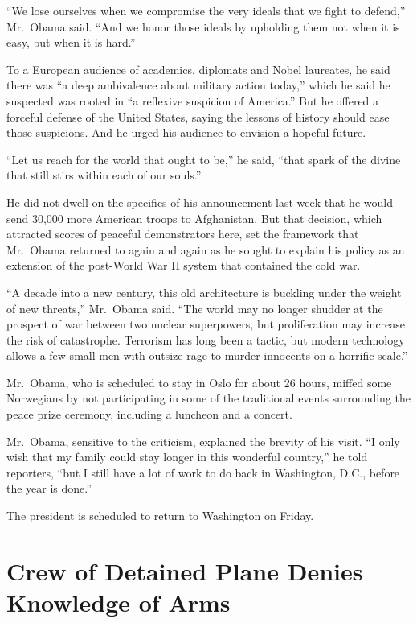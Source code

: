 ﻿\documentclass[12pt]{article}
\begin{document}
``We lose ourselves when we compromise the very ideals that we fight to defend,'' Mr.~Obama said.
``And we honor those ideals by upholding them not when it is easy, but when it is hard.''

To a European audience of academics, diplomats and Nobel laureates, he said there was ``a deep
ambivalence about military action today,'' which he said he suspected was rooted in ``a reflexive
suspicion of America.'' But he offered a forceful defense of the United States, saying the lessons
of history should ease those suspicions. And he urged his audience to envision a hopeful future.

``Let us reach for the world that ought to be,'' he said, ``that spark of the divine that still
stirs within each of our souls.''

He did not dwell on the specifics of his announcement last week that he would send 30,000 more
American troops to Afghanistan. But that decision, which attracted scores of peaceful demonstrators
here, set the framework that Mr.~Obama returned to again and again as he sought to explain his
policy as an extension of the post-World War II system that contained the cold war.

``A decade into a new century, this old architecture is buckling under the weight of new threats,''
Mr.~Obama said. ``The world may no longer shudder at the prospect of war between two nuclear
superpowers, but proliferation may increase the risk of catastrophe. Terrorism has long been a
tactic, but modern technology allows a few small men with outsize rage to murder innocents on a
horrific scale.''

Mr.~Obama, who is scheduled to stay in Oslo for about 26 hours, miffed some Norwegians by not
participating in some of the traditional events surrounding the peace prize ceremony, including a
luncheon and a concert.

Mr.~Obama, sensitive to the criticism, explained the brevity of his visit. ``I only wish that my
family could stay longer in this wonderful country,'' he told reporters, ``but I still have a lot of
work to do back in Washington, D.C., before the year is done.''

The president is scheduled to return to Washington on Friday.

\section{Crew of Detained Plane Denies Knowledge of Arms}
\end{document}
